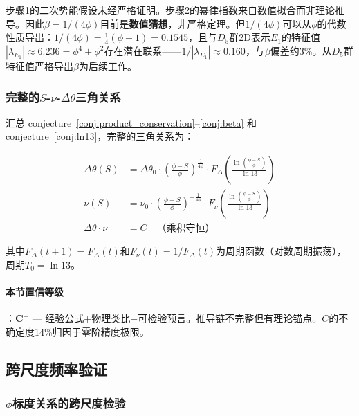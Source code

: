 \begin{remark}[推导链的诚实评估]
步骤1的二次势能假设未经严格证明。步骤2的幂律指数来自数值拟合而非理论推导。因此$\beta = 1/(4\phi)$目前是\textbf{数值猜想}，非严格定理。但$1/(4\phi)$可以从$\phi$的代数性质导出：$1/(4\phi) = \frac{1}{4}(\phi - 1) = 0.1545$，且与$D_5$群2D表示$E_1$的特征值$|\lambda_{E_1}| \approx 6.236 = \phi^4 + \phi^2$存在潜在联系——$1/|\lambda_{E_1}| \approx 0.160$，与$\beta$偏差约3\%。从$D_5$群特征值严格导出$\beta$为后续工作。
\end{remark}

\subsubsection{完整的$S$-$\nu$-$\Delta\theta$三角关系}

汇总 conjecture~\ref{conj:product_conservation}--\ref{conj:beta} 和 conjecture~\ref{conj:ln13}，完整的三角关系为：

\begin{equation}
\boxed{
\begin{aligned}
\Delta\theta(S) &= \Delta\theta_0 \cdot \left(\frac{\phi - S}{\phi}\right)^{\frac{1}{4\phi}} \cdot F_\Delta\!\left(\frac{\ln\!\left(\frac{\phi-S}{\phi}\right)}{\ln 13}\right) \\[6pt]
\nu(S) &= \nu_0 \cdot \left(\frac{\phi - S}{\phi}\right)^{-\frac{1}{4\phi}} \cdot F_\nu\!\left(\frac{\ln\!\left(\frac{\phi-S}{\phi}\right)}{\ln 13}\right) \\[6pt]
\Delta\theta \cdot \nu &= C \quad \text{（乘积守恒）}
\end{aligned}
}
\label{eq:triangle_relation}
\end{equation}

其中$F_\Delta(t+1) = F_\Delta(t)$和$F_\nu(t) = 1/F_\Delta(t)$为周期函数（对数周期振荡），周期$T_0 = \ln 13$。

\paragraph{本节置信等级}：\textbf{C$^+$} --- 经验公式+物理类比+可检验预言。推导链不完整但有理论锚点。$C$的不确定度14\%归因于零阶精度极限。

\subsection{跨尺度频率验证}
\label{subsec:cross_scale}

\subsubsection{$\phi$标度关系的跨尺度检验}

